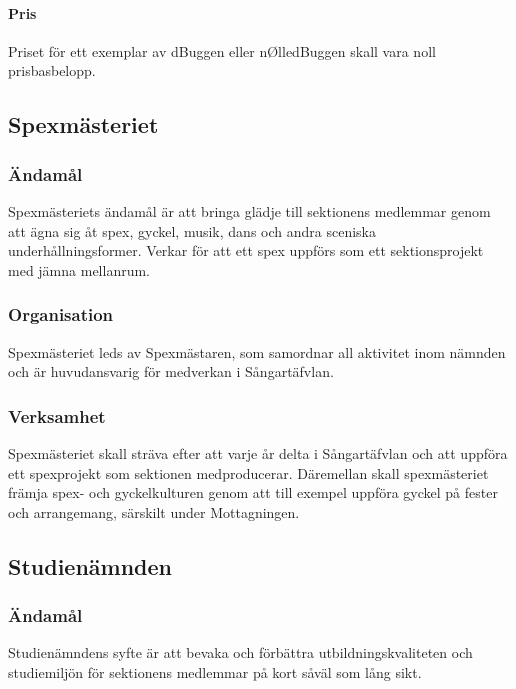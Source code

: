 \documentclass[a4paper,12pt]{article}
\begin{document}
\paragraph{Pris}

Priset för ett exemplar av dBuggen eller nØlledBuggen skall vara noll prisbasbelopp.

\subsection{Spexmästeriet}

\subsubsection{Ändamål}

Spexmästeriets ändamål är att bringa glädje till sektionens medlemmar genom att ägna sig åt spex, gyckel, musik, dans och andra sceniska underhållningsformer.
Verkar för att ett spex uppförs som ett sektionsprojekt med jämna mellanrum.

\subsubsection{Organisation}

Spexmästeriet leds av Spexmästaren, som samordnar all aktivitet inom nämnden och är huvudansvarig för medverkan i Sångartäfvlan.

\subsubsection{Verksamhet}

Spexmästeriet skall sträva efter att varje år delta i Sångartäfvlan och att uppföra ett spexprojekt som sektionen medproducerar.
Däremellan skall spexmästeriet främja spex- och gyckelkulturen genom att till exempel uppföra gyckel på fester och arrangemang,
särskilt under Mottagningen.

\subsection{Studienämnden}

\subsubsection{Ändamål}

Studienämndens syfte är att bevaka och förbättra utbildningskvaliteten och studiemiljön för sektionens medlemmar på kort såväl som lång sikt.
\end{document}
